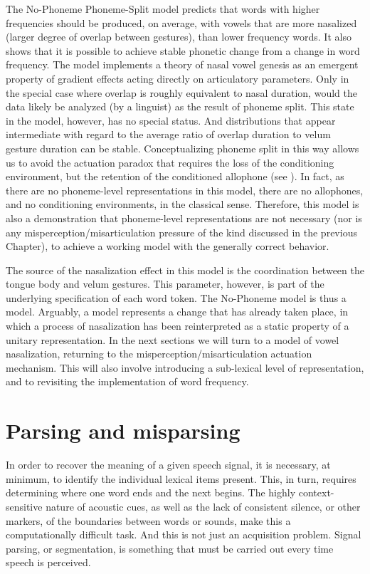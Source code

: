 The No-Phoneme Phoneme-Split model predicts that words with higher
frequencies should be produced, on average, with vowels that are more
nasalized (larger degree of overlap between gestures), than lower
frequency words. It also shows that it is possible to achieve stable
phonetic change from a change in word frequency. The model implements
a theory of nasal vowel genesis as an emergent property of gradient
effects acting directly on articulatory parameters. Only in the special
case where overlap is roughly equivalent to nasal duration, would
the data likely be analyzed (by a linguist) as the result of phoneme
split. This state in the model, however, has no special status. And
distributions that appear intermediate with regard to the average
ratio of overlap duration to velum gesture duration can be stable.
Conceptualizing phoneme split in this way allows us to avoid the actuation
paradox that requires the loss of the conditioning environment, but
the retention of the conditioned allophone (see ).
In fact, as there are no phoneme-level representations in this model,
there are no allophones, and no conditioning environments, in the
classical sense. Therefore, this model is also a demonstration that
phoneme-level representations are not necessary (nor is any misperception/misarticulation
pressure of the kind discussed in the previous Chapter), to achieve
a working model with the generally correct behavior. 

The source of the nasalization effect in this model is the coordination
between the tongue body and velum gestures. This parameter, however,
is part of the underlying specification of each word token. The No-Phoneme
model is thus a  model. Arguably, a  model
represents a change that has already taken place, in which a process
of nasalization has been reinterpreted as a static property of a unitary
representation. In the next sections we will turn to a 
model of vowel nasalization, returning to the misperception/misarticulation
actuation mechanism. This will also involve introducing a sub-lexical
level of representation, and to revisiting the implementation of word
frequency.

\section{Parsing and misparsing}

In order to recover the meaning of a given speech signal, it is necessary,
at minimum, to identify the individual lexical items present. This,
in turn, requires determining where one word ends and the next begins.
The highly context-sensitive nature of acoustic cues, as well as the
lack of consistent silence, or other markers, of the boundaries between
words or sounds, make this a computationally difficult task. And this
is not just an acquisition problem. Signal parsing, or segmentation,
is something that must be carried out every time speech is perceived. 

